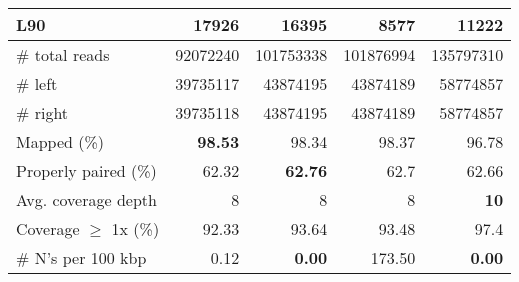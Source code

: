 \documentclass[12pt,a4paper]{article}
\begin{document}
\begin{table}[ht]
\begin{center}
\begin{tabular}{|l*{4}{|r}|}
L90 & 17926 & 16395 & {\bf 8577} & 11222 \\ \hline
\# total reads & 92072240 & 101753338 & 101876994 & 135797310 \\ \hline
\# left & 39735117 & 43874195 & 43874189 & 58774857 \\ \hline
\# right & 39735118 & 43874195 & 43874189 & 58774857 \\ \hline
Mapped (\%) & {\bf 98.53} & 98.34 & 98.37 & 96.78 \\ \hline
Properly paired (\%) & 62.32 & {\bf 62.76} & 62.7 & 62.66 \\ \hline
Avg. coverage depth & 8 & 8 & 8 & {\bf 10} \\ \hline
Coverage $\geq$ 1x (\%) & 92.33 & 93.64 & 93.48 & 97.4 \\ \hline
\# N's per 100 kbp & 0.12 & {\bf 0.00} & 173.50 & {\bf 0.00} \\ \hline
\end{tabular}
\end{center}
\end{table}
\end{document}
